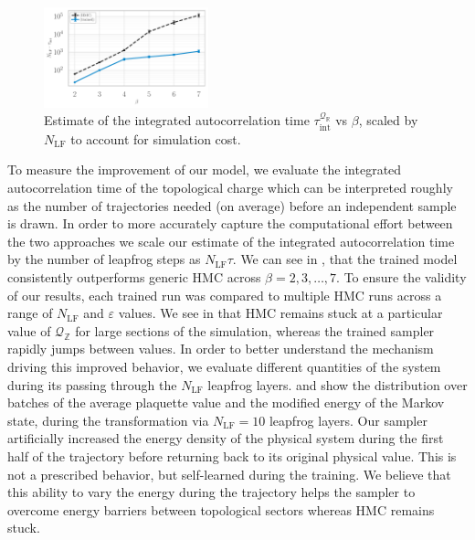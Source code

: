 \documentclass{article} %
\begin{document}
\begin{figure}
   \centering
      \centering
      \includegraphics[width=0.425\textwidth]{figures/autocorr_vs_beta_blue_2120.pdf}
      \caption{\label{fig:autocorrvsbeta}Estimate of the integrated autocorrelation time
      \(\tau_{\mathrm{int}}^{\mathcal{Q}_{\mathbb{R}}}\) vs \(\beta\), scaled by \(N_{\mathrm{LF}}\) to account for
   simulation cost.}
\end{figure}
To measure the improvement of our model, we evaluate the integrated autocorrelation time of the topological charge which
can be interpreted roughly as the number of trajectories needed (on average) before an independent sample is drawn.
%
In order to more accurately capture the computational effort between the two approaches we scale our estimate of the
integrated autocorrelation time by the number of leapfrog steps as \(N_{\mathrm{LF}}\tau\).  We can see in
, that the trained model consistently outperforms generic HMC across \(\beta = 2, 3, \ldots,
7\).
%
To ensure the validity of our results, each trained run was compared to multiple HMC runs across a range of
\(N_{\mathrm{LF}}\) and \(\varepsilon\) values.
%
We see in  that HMC remains stuck at a particular value of \(\mathcal{Q}_{\mathbb{Z}}\) for large
sections of the simulation, whereas the trained sampler rapidly jumps between values.
%
In order to better understand the mechanism driving this improved behavior, we evaluate different quantities of the
system during its passing through the $N_{\mathrm{LF}}$ leapfrog layers.
%
 and  show the distribution over batches of the average plaquette value and the
modified energy of the Markov state, during the transformation via $N_{\mathrm{LF}}=10$ leapfrog layers.
%
Our sampler artificially increased the energy density of the physical system during the first half of the trajectory
before returning back to its original physical value.  This is not a prescribed behavior, but self-learned during the
training.
%
We believe that this ability to vary the energy during the trajectory helps the sampler to overcome energy barriers
between topological sectors whereas HMC remains stuck.
\end{document}
